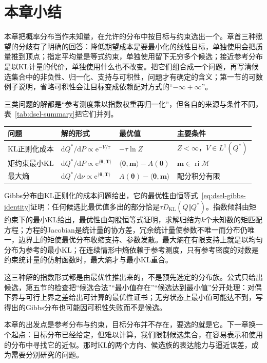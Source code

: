\section{本章小结}
\label{sec:dsel-summary}

本章把概率分布当作未知量，在允许的分布中按目标与约束选出一个。章首三种愿望的分歧有了明确的回答：降低期望成本是要最小化的线性目标，单独使用会把质量推到顶点；指定平均量是等式约束，单独使用留下无穷多个候选；接近参考分布是以KL计量的代价，单独使用什么也不改变。把它们组合成一个问题，再写清候选集合中的非负性、归一化、支持与可积性，问题才有确定的含义；第一节的可数例子说明，省略可积性会让目标变成依赖配对方式的“$-\infty+\infty$”。

三类问题的解都是“参考测度乘以指数权重再归一化”，但各自的来源与条件不同，表~\ref{tab:dsel-summary}把它们并列。

\begin{BookInlineTable}
 \centering
 \caption{本章三类分布选择问题。$A(\bm{\theta})$是以参考测度为基准的对数配分函数，$Z=\mathbb{E}_{P}[\mathrm{e}^{-V/\tau}]$。矩约束最小KL的条件指有限状态、参考概率处处为正的情形；最大熵还要求候选分布的熵有定义。}
 \label{tab:dsel-summary}
 \small
 \begin{tabular}{llll}
 \toprule
 问题 & 解的形式 & 最优值 & 主要条件 \\
 \midrule
 KL正则化成本 & $\mathrm{d}Q^{*}/\mathrm{d}P\propto\mathrm{e}^{-V/\tau}$ & $-\tau\ln Z$ & $Z<\infty$，$V\in L^{1}(Q^{*})$ \\
 矩约束最小KL & $\mathrm{d}Q^{*}/\mathrm{d}P\propto\mathrm{e}^{\langle\bm{\theta},\bm{T}\rangle}$ & $\langle\bm{\theta},\bm{m}\rangle-A(\bm{\theta})$ & $\bm{m}\in\operatorname{ri}\mathcal{M}$ \\
 最大熵 & $\mathrm{d}Q^{*}/\mathrm{d}\nu\propto\mathrm{e}^{\langle\bm{\theta},\bm{T}\rangle}$ & $A(\bm{\theta})-\langle\bm{\theta},\bm{m}\rangle$ & 配分积分有限 \\
 \bottomrule
 \end{tabular}
\end{BookInlineTable}

Gibbs分布由KL正则化的成本问题给出，它的最优性由恒等式~\eqref{eq:dsel-gibbs-identity}证明：任何候选比最优值多出的部分恰是$\tau D_{\mathrm{KL}}(Q\Vert Q^{*})$。指数倾斜由矩约束下的最小KL给出，最优性由勾股恒等式证明，求解归结为$k$个未知数的矩匹配方程；方程的Jacobian是统计量的协方差，冗余统计量使参数不唯一而分布仍唯一，边界上的矩使最优分布收缩支持、参数发散。最大熵在有限支持上就是以均匀分布为参考的最小KL；在连续情形中熵依赖于参考测度，只有参考密度的对数是约束统计量的仿射函数时，最大熵才与最小KL重合。

这三种解的指数形式都是由最优性推出来的，不是预先选定的分布族。公式只给出候选，第五节的检查把“候选合法”“最小值存在”“候选达到最小值”分开处理：对偶下界与可行上界之差给出可计算的最优性证书；无穷状态上最小值可能达不到，写得出的Gibbs分布也可能因可积性失败而不是候选。

本章的出发点是参考分布与约束，目标分布并不存在，要选的就是它。下一章换一个起点：目标分布已经给定，但难以计算，我们限制候选集合，在容易表示和使用的分布中寻找它的近似。那时KL的两个方向、候选族的表达能力与逼近误差，成为需要分别研究的问题。

